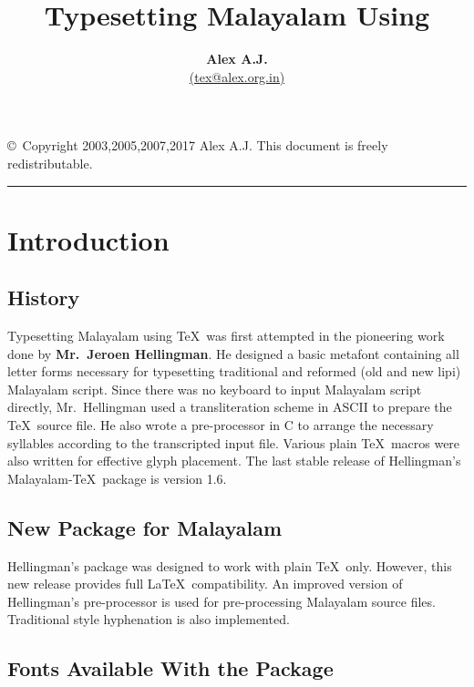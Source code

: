 \documentclass[12pt]{article}
\begin{document}
\title{\bfseries Typesetting Malayalam Using \LaTeXe}
\author{{\bfseries Alex A.J.}\\
\href{mailto:tex@alex.org.in}{(tex@alex.org.in)}}
\date{}
\maketitle

\noindent \copyright\ Copyright 2003,2005,2007,2017 Alex A.J.
This document is freely redistributable.


\tableofcontents

\medskip

\hrule

\section{Introduction}

\subsection{History}

Typesetting Malayalam using \TeX\ was first attempted in the
pioneering work done by {\bf Mr.~Jeroen Hellingman}. He designed
a basic metafont containing all letter forms necessary for
typesetting traditional and reformed (old and new lipi)
Malayalam script. Since there was no keyboard
to input Malayalam script directly, Mr.~Hellingman used a
transliteration scheme in ASCII to prepare the \TeX\ source file.
He also wrote a pre-processor in C to arrange the necessary
syllables according to the transcripted input file.
Various plain \TeX\ macros were also written for effective
glyph placement. The last stable release of Hellingman's
Malayalam-\TeX\ package is version 1.6.

\subsection{New Package for Malayalam}

Hellingman's package was designed to work with plain \TeX\ only.
However, this new release provides full \LaTeX\ compatibility.
An improved version of Hellingman's pre-processor is used
for pre-processing Malayalam source files. Traditional
style hyphenation is also implemented.

\subsection{Fonts Available With the Package}
\end{document}

